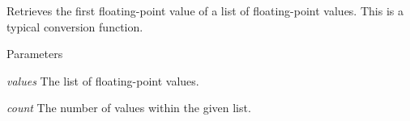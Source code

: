 \label{namespaceFCDAnimationCurveTools_a52f0bc674ece31d37bef0b8cf7999a27}
Retrieves the first floating-\/point value of a list of floating-\/point values. This is a typical conversion function. 
\begin{DoxyParams}{Parameters}
\item[{\em values}]The list of floating-\/point values. \item[{\em count}]The number of values within the given list. \end{DoxyParams}
